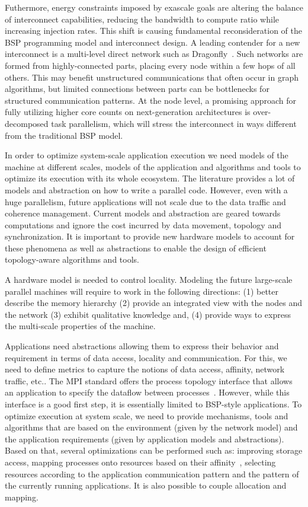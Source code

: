 Futhermore, energy constraints imposed by exascale goals are altering
the balance of interconnect capabilities, reducing the bandwidth to
compute ratio while increasing injection rates.  This shift is causing
fundamental reconsideration of the BSP programming model and
interconnect design.  A leading contender for a new interconnect is a
multi-level direct network such as
Dragonfly~\cite{4556717,ibm-percs-network}.  Such networks are formed
from highly-connected parts, placing every node within a few hops of all
others.  This may benefit unstructured communications that often occur
in graph
algorithms, but limited connections between parts can be bottlenecks for
structured communication patterns.  At the node level, a promising approach for fully utilizing
higher core counts on next-generation architectures is over-decomposed
task parallelism, which will stress the interconnect in ways different
from the traditional BSP model.


In order to optimize system-scale application execution we need models
of the machine at different scales, models of the application and algorithms
and tools to optimize its execution with its whole ecosystem. 
The literature provides a lot of models and abstraction on how to write a
parallel code. However, even with a huge parallelism, future applications will
not scale due to the data traffic and coherence management. Current models and
abstraction are geared towards computations and ignore the cost incurred by data
movement, topology and synchronization.  It is important to provide new hardware
models to account for these phenomena as well as abstractions to enable the
design of efficient topology-aware algorithms and tools. 

A hardware model is needed to control locality.  Modeling the future large-scale
parallel machines will require to work in the following directions: (1) better
describe the memory hierarchy (2) provide an integrated view with the nodes and
the network (3) exhibit qualitative knowledge and, (4) provide ways to express
the multi-scale properties of the machine.

Applications need abstractions allowing them to express their behavior
and requirement in terms of data access, locality and communication.
For this, we need to define metrics to capture the notions of data
access, affinity, network traffic, etc.. The MPI standard offers the
process topology interface that allows an application to specify the
dataflow between processes~\cite{hoefler-mpi-2.2-scal-topo}. However,
while this interface is a good first step, it is essentially limited to
BSP-style applications.
%
To optimize execution at system scale, we need to provide mechanisms,
tools and algorithms that are based on the environment (given by the
network model) and the application requirements (given by application
models and abstractions). Based on that, several optimizations can be
performed such as: improving storage access, mapping processes onto
resources based on their
affinity~\cite{hjm14,DBLP:conf/ics/HoeflerS11,Navauxandal2009},
selecting resources according to the application communication pattern
and the pattern of the currently running applications. It is also
possible to couple allocation and mapping.


